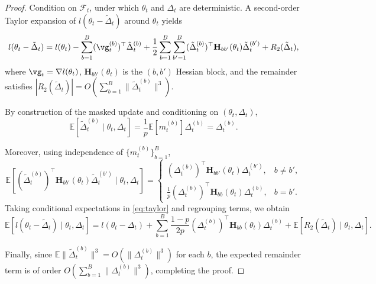 \documentclass[11pt, a4paper, twocolumn, copyright, goog]{google}
\theoremstyle{plain}
\theoremstyle{definition}
\theoremstyle{remark}
\begin{document}
\begin{proof}
Condition on $\mathcal F_t$, under which $\theta_t$ and $\Delta_t$ are deterministic.
A second-order Taylor expansion of $l(\theta_t-\tilde{\Delta}_t)$ around $\theta_t$ yields
\begin{equation} \label{eq:taylor}
    l(\theta_t-\tilde{\Delta}_t) = l(\theta_t) - \sum_{b=1}^B (\vg_t^{(b)})^\top \tilde{\Delta}_t^{(b)} + \frac{1}{2} \sum_{b=1}^B\sum_{b'=1}^B (\tilde{\Delta}_t^{(b)})^\top \mathbf{H}_{bb'}(\theta_t) \tilde{\Delta}_t^{(b')} + R_2(\tilde{\Delta}_t),
\end{equation}
where $\vg_t=\nabla l(\theta_t)$, $\mathbf{H}_{bb'}(\theta_t)$ is the $(b,b')$ Hessian block, and the remainder satisfies $|R_2(\tilde{\Delta}_t)| = O \left(\sum_{b=1}^B \|\tilde{\Delta}_t^{(b)}\|^3\right).$

By construction of the masked update and conditioning on $(\theta_t,\Delta_t)$,
\begin{equation}
    \mathbb{E}[\tilde{\Delta}_t^{(b)} \mid \theta_t,\Delta_t] = \frac{1}{p}\mathbb{E}[m_{t}^{(b)}]\Delta_t^{(b)} = \Delta_t^{(b)}.
\end{equation}

Moreover, using independence of $\{m_{t}^{(b)}\}_{b=1}^B$,
\begin{equation}
    \mathbb{E} \left[ (\tilde{\Delta}_t^{(b)})^\top \mathbf{H}_{bb'}(\theta_t) \tilde{\Delta}_t^{(b')} \mid \theta_t,\Delta_t \right] =
        \begin{cases}
        (\Delta_t^{(b)})^\top \mathbf{H}_{bb'}(\theta_t)\Delta_t^{(b')},          & b\neq b',\\[6pt]
        \frac{1}{p} (\Delta_t^{(b)})^\top \mathbf{H}_{bb}(\theta_t)\Delta_t^{(b)},
        & b=b'.
        \end{cases}
\end{equation}
Taking conditional expectations in \eqref{eq:taylor} and regrouping terms, we obtain
\begin{equation}
    \mathbb{E}[l(\theta_t-\tilde{\Delta}_t)\mid \theta_t,\Delta_t] = l(\theta_t-\Delta_t) + \sum_{b=1}^B \frac{1-p}{2p} (\Delta_t^{(b)})^\top \mathbf{H}_{bb}(\theta_t) \Delta_t^{(b)}  + \mathbb{E}[R_2(\tilde{\Delta}_t)\mid \theta_t,\Delta_t].
\end{equation}

Finally, since $\mathbb{E}\|\tilde{\Delta}_t^{(b)}\|^3 = O(\|\Delta_t^{(b)}\|^3)$ for each $b$, the expected remainder term is of order $O \left(\sum_{b=1}^B \|\Delta_t^{(b)}\|^3\right)$, completing the proof.
\end{proof}
\end{document}
